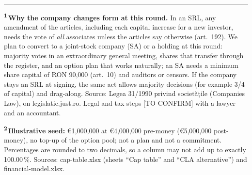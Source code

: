 \documentclass[10pt]{article}
\newcommand{\nota}[1]{\textsuperscript{\color{brandBlue}\bfseries #1}}
\begin{document}
\vfill
{\color{brandLine}\rule{\linewidth}{0.5pt}}\par\vspace{3pt}
\begin{minipage}[t]{\linewidth}\RaggedRight
\fontsize{7.3}{9}\selectfont\color{brandSlate}
\nota{1}\,\textbf{Why the company changes form at this round.} In an SRL, any amendment of the articles, including each capital increase for a new investor, needs the vote of \emph{all} associates unless the articles say otherwise (art.\ 192). We plan to convert to a joint-stock company (SA) or a holding at this round: majority votes in an extraordinary general meeting, shares that transfer through the register, and an option plan that works naturally; an SA needs a minimum share capital of RON 90,000 (art.\ 10) and auditors or censors. If the company stays an SRL at signing, the same act allows majority decisions (for example 3/4 of capital) and drag-along. Source: Legea 31/1990 privind societățile (Companies Law), on legislatie.just.ro. Legal and tax steps [TO CONFIRM] with a lawyer and an accountant.\par\vspace{2pt}
\nota{2}\,\textbf{Illustrative seed:} €1,000,000 at €4,000,000 pre-money (€5,000,000 post-money), no top-up of the option pool; not a plan and not a commitment. Percentages are rounded to two decimals, so a column may not add up to exactly 100.00\,\%. Sources: cap-table.xlsx (sheets ``Cap table'' and ``CLA alternative'') and financial-model.xlsx.\par
\end{minipage}
\end{document}
